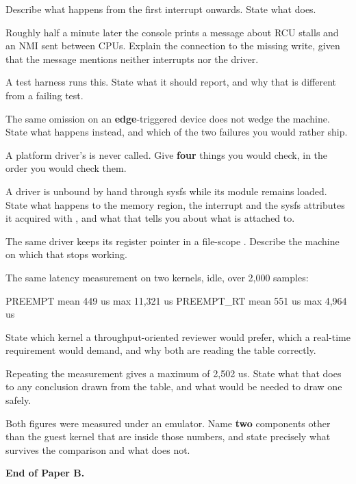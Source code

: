  Describe what happens from the first interrupt onwards. State what  does. 

 Roughly half a minute later the console prints a message about RCU stalls and an NMI sent
between CPUs. Explain the connection to the missing write, given that the message mentions neither
interrupts nor the driver. 

 A test harness runs this. State what it should report, and why that is different from a
failing test. 

 The same omission on an \textbf{edge}-triggered device does not wedge the machine. State
what happens instead, and which of the two failures you would rather ship. 

\label{exb:q:9}

 A platform driver's  is never called. Give \textbf{four} things you would
check, in the order you would check them. 

 A driver is unbound by hand through sysfs while its module remains loaded. State what
happens to the memory region, the interrupt and the sysfs attributes it acquired with ,
and what that tells you about what  is attached to. 

 The same driver keeps its register pointer in a file-scope . Describe the
machine on which that stops working. 

\label{exb:q:10}

The same latency measurement on two kernels, idle, over 2,000 samples:

\begin{console}
PREEMPT      mean  449 us   max 11,321 us
PREEMPT_RT   mean  551 us   max  4,964 us
\end{console}

 State which kernel a throughput-oriented reviewer would prefer, which a real-time
requirement would demand, and why both are reading the table correctly. 

 Repeating the  measurement gives a maximum of 2,502 us. State what that does
to any conclusion drawn from the table, and what would be needed to draw one safely. 

 Both figures were measured under an emulator. Name \textbf{two} components other than the
guest kernel that are inside those numbers, and state precisely what survives the comparison and
what does not. 

\textbf{End of Paper B.}
